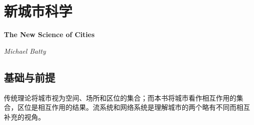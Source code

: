 \chapter{新城市科学}
\Large\textbf{The New Science of Cities}
\par \emph{Michael Batty} \normalsize

\section{基础与前提}
\par 传统理论将城市视为空间、场所和区位的集合；而本书将城市看作相互作用的集合，区位是相互作用的结果。流系统和网络系统是理解城市的两个略有不同而相互补充的视角。
